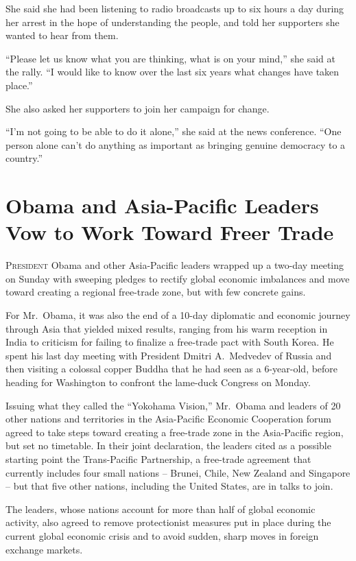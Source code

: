 ﻿\documentclass[12pt]{article}
\begin{document}
She said she had been listening to radio broadcasts up to six hours a day during her arrest in the
hope of understanding the people, and told her supporters she wanted to hear from them.

``Please let us know what you are thinking, what is on your mind,'' she said at the rally. ``I would
like to know over the last six years what changes have taken place.''

She also asked her supporters to join her campaign for change.

``I'm not going to be able to do it alone,'' she said at the news conference. ``One person alone
can't do anything as important as bringing genuine democracy to a country.''

\section{Obama and Asia-Pacific Leaders Vow to Work Toward Freer Trade}

\lettrine{P}{resident} Obama and other Asia-Pacific leaders wrapped up a
two-day meeting on Sunday with sweeping pledges to rectify global economic imbalances and move
toward creating a regional free-trade zone, but with few concrete gains.

For Mr.~Obama, it was also the end of a 10-day diplomatic and economic journey through Asia that
yielded mixed results, ranging from his warm reception in India to criticism for failing to finalize
a free-trade pact with South Korea. He spent his last day meeting with President Dmitri A.~Medvedev
of Russia and then visiting a colossal copper Buddha that he had seen as a 6-year-old, before
heading for Washington to confront the lame-duck Congress on Monday.

Issuing what they called the ``Yokohama Vision,'' Mr.~Obama and leaders of 20 other nations and
territories in the Asia-Pacific Economic Cooperation forum agreed to take steps toward creating a
free-trade zone in the Asia-Pacific region, but set no timetable. In their joint declaration, the
leaders cited as a possible starting point the Trans-Pacific Partnership, a free-trade agreement
that currently includes four small nations -- Brunei, Chile, New Zealand and Singapore -- but that
five other nations, including the United States, are in talks to join.

The leaders, whose nations account for more than half of global economic activity, also agreed to
remove protectionist measures put in place during the current global economic crisis and to avoid
sudden, sharp moves in foreign exchange markets.
\end{document}

